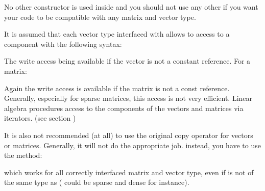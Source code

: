 \documentclass[a4paper,11pt,english]{sphinxmanual}
\begin{document}
No other constructor is used inside  and you should not use any other if you want your code
to be compatible with any matrix and vector type.

It is assumed that each vector type interfaced with  allows to
access to a component with the following syntax:

\begin{sphinxVerbatim}[commandchars=\\\{\}]
  \PYG{p}{[}\PYG{p}{]}    
\PYG{p}{[}\PYG{p}{]}      
\end{sphinxVerbatim}

The write access being available if the vector is not a constant reference. For a matrix:

\begin{sphinxVerbatim}[commandchars=\\\{\}]
    
    
\end{sphinxVerbatim}

Again the write access is available if the matrix is not a const reference. Generally, especially for sparse matrices, this access is not very efficient. Linear algebra procedures access to the components of the vectors and matrices via iterators. (see section  {\hyperref[\detokenize{gmm/inside:gmm-inside}]{}})

It is also not recommended (at all) to use the original copy operator for vectors or matrices. Generally, it will not do the appropriate job. instead, you have to use the method:

\begin{sphinxVerbatim}[commandchars=\\\{\}]
   
\end{sphinxVerbatim}

which works for all correctly interfaced matrix and vector type, even if  is not of the same type as  ( could be sparse and  dense for instance).
\end{document}
